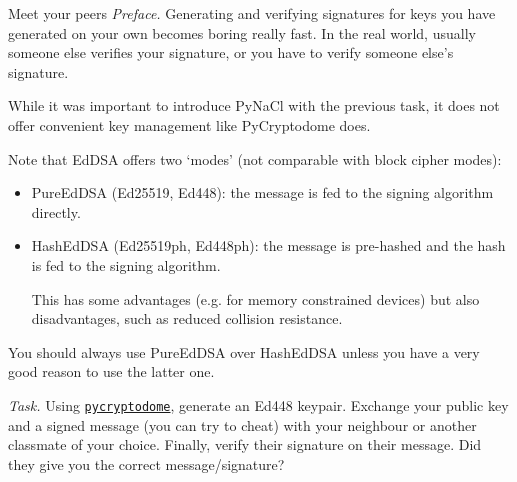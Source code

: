 \documentclass{practice}
\begin{document}
\begin{task}{Meet your peers}
  \textit{Preface.}
  Generating and verifying signatures for keys you have generated on your own becomes boring really fast.
  In the real world, usually someone else verifies your signature,
  or you have to verify someone else's signature.

  While it was important to introduce PyNaCl with the previous task, it does not offer convenient key management like PyCryptodome does.

  Note that EdDSA offers two `modes' (not comparable with block cipher modes):
  \begin{itemize}
    \item PureEdDSA (Ed25519, Ed448): the message is fed to the signing algorithm directly.
    \item HashEdDSA (Ed25519ph, Ed448ph): the message is pre-hashed and the hash is fed to the signing algorithm.
    
    This has some advantages (e.g. for memory constrained devices) but also disadvantages, such as reduced collision resistance.
  \end{itemize}
  You should always use PureEdDSA over HashEdDSA unless you have a very good reason to use the latter one.

  \textit{Task.}
  Using \href{https://pycryptodome.readthedocs.io/en/latest/src/signature/eddsa.html}{\texttt{pycryptodome}}, generate an Ed448 keypair.
  Exchange your public key and a signed message (you can try to cheat) with your neighbour or another classmate of your choice.
  Finally, verify their signature on their message.
  Did they give you the correct message/signature?
\end{task}
\end{document}
